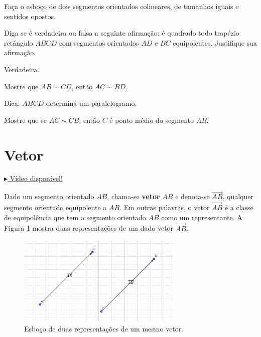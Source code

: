 \begin{exer}
  Faça o esboço de dois segmentos orientados colineares, de tamanhos iguais e sentidos opostos.
\end{exer}

\begin{exer}
  Diga se é verdadeira ou falsa a seguinte afirmação: é quadrado todo trapézio retângulo $ABCD$ com segmentos orientados $AD$ e $BC$ equipolentes. Justifique sua afirmação. 
\end{exer}
\begin{resp}
  Verdadeira.
\end{resp}

\begin{exer}
  Mostre que $AB\sim CD$, então $AC\sim BD$.
\end{exer}
\begin{resp}
  Dica: $ABCD$ determina um paralelogramo.
\end{resp}

\begin{exer}
  Mostre que se $AC\sim CB$, então $C$ é ponto médio do segmento $AB$.
\end{exer}

\section{Vetor}\label{cap_vetor_sec_vetor}

\begin{flushright}
  \href{https://archive.org/details/definicao-vetor}{$\blacktriangleright$ Vídeo disponível!}
\end{flushright}

Dado um segmento orientado $AB$, chama-se {\bf vetor} $AB$ e denota-se $\overrightarrow{AB}$, qualquer segmento orientado equipolente a $AB$. Em outras palavras, o vetor $\overrightarrow{AB}$ é a classe de equipolência que tem o segmento orientado $AB$ como um representante. A Figura \ref{fig:vetor} mostra duas representações de um dado vetor $\overrightarrow{AB}$.

\begin{figure}[h!]
  \centering
  \includegraphics[width=0.7\textwidth]{./cap_vetor/dados/fig_vetor/fig_vetor}
  \caption{Esboço de duas representações de um mesmo vetor.}
  \label{fig:vetor}
\end{figure}

